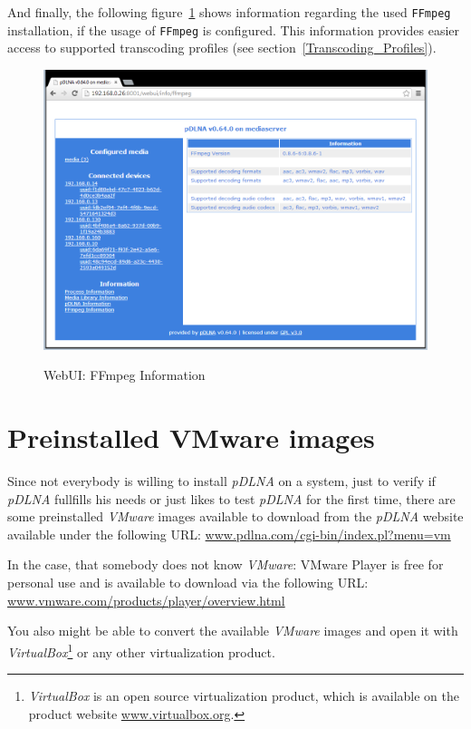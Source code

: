 \documentclass[a4paper,oneside,10pt]{report}
\begin{document}
And finally, the following figure~\ref{fig:webgui-ffmpeg} shows information regarding the used \verb|FFmpeg| installation, if the usage of \verb|FFmpeg| is configured. This information provides easier access to supported transcoding profiles (see section~\ref{Transcoding_Profiles}).

\begin{figure}
	\centering
		\includegraphics[width=34em]{images/webui_info_ffmpeg}
	\label{fig:webgui-ffmpeg}
	\caption{WebUI: FFmpeg Information}
\end{figure}

%
%

\chapter{Preinstalled VMware images}
\label{vms}

Since not everybody is willing to install {\em pDLNA} on a system, just to verify if {\em pDLNA} fullfills his needs or just likes to test {\em pDLNA} for the first time, there are some preinstalled {\em VMware} images available to download from the {\em pDLNA} website available under the following URL: \url{www.pdlna.com/cgi-bin/index.pl?menu=vm}

In the case, that somebody does not know {\em VMware}: VMware Player is free for personal use and is available to download via the following URL: \url{www.vmware.com/products/player/overview.html}

You also might be able to convert the available {\em VMware} images and open it with {\em VirtualBox}\footnote{{\em VirtualBox} is an open source virtualization product, which is available on the product website \url{www.virtualbox.org}.} or any other virtualization product.
\end{document}
